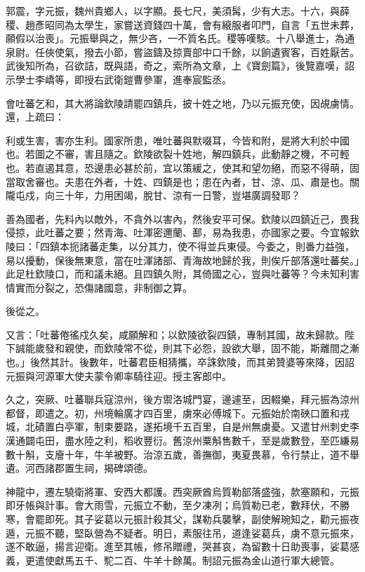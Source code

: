 \begin{pinyinscope}
 郭震，字元振，魏州貴鄉人，以字顯。長七尺，美須髯，少有大志。十六，與薛稷、趙彥昭同為太學生，家嘗送資錢四十萬，會有縗服者叩門，自言「五世未葬，願假以治喪」。元振舉與之，無少吝，一不質名氏。稷等嘆駭。十八舉進士，為通泉尉。任俠使氣，撥去小節，嘗盜鑄及掠賣部中口千餘，以餉遺賓客，百姓厭苦。武後知所為，召欲詰，既與語，奇之，索所為文章，上《寶劍篇》，後覽嘉嘆，詔示學士李嶠等，即授右武衛鎧曹參軍，進奉宸監丞。



 會吐蕃乞和，其大將論欽陵請罷四鎮兵，披十姓之地，乃以元振充使，因覘虜情。還，上疏曰：



 利或生害，害亦生利。國家所患，唯吐蕃與默啜耳，今皆和附，是將大利於中國也。若圖之不審，害且隨之。欽陵欲裂十姓地，解四鎮兵，此動靜之機，不可輕也。若直遏其意，恐邊患必甚於前，宜以策緩之，使其和望勿絕，而惡不得萌，固當取舍審也。夫患在外者，十姓、四鎮是也；患在內者，甘、涼、瓜、肅是也。關隴屯戍，向三十年，力用困竭，脫甘、涼有一日警，豈堪廣調發耶？



 善為國者，先料內以敵外，不貪外以害內，然後安平可保。欽陵以四鎮近己，畏我侵掠，此吐蕃之要；然青海、吐渾密邇蘭、鄯，易為我患，亦國家之要。今宜報欽陵曰：「四鎮本扼諸蕃走集，以分其力，使不得並兵東侵。今委之，則番力益強，易以擾動，保後無東意，當在吐渾諸部、青海故地歸於我，則俟斤部落還吐蕃矣。」此足杜欽陵口，而和議未絕。且四鎮久附，其倚國之心，豈與吐蕃等？今未知利害情實而分裂之，恐傷諸國意，非制御之算。



 後從之。



 又言：「吐蕃倦徭戍久矣，咸願解和；以欽陵欲裂四鎮，專制其國，故未歸款。陛下誠能歲發和親使，而欽陵常不從，則其下必怨，設欲大舉，固不能，斯離間之漸也。」後然其計。後數年，吐蕃君臣相猜攜，卒誅欽陵，而其弟贊婆等來降，因詔元振與河源軍大使夫蒙令卿率騎往迎。授主客郎中。



 久之，突厥、吐蕃聯兵寇涼州，後方禦洛城門宴，邊遽至，因輟樂，拜元振為涼州都督，即遣之。初，州境輪廣才四百里，虜來必傅城下。元振始於南硤口置和戎城，北磧置白亭軍，制束要路，遂拓境千五百里，自是州無虜憂。又遣甘州刺史李漢通闢屯田，盡水陸之利，稻收豐衍。舊涼州粟斛售數千，至是歲數登，至匹縑易數十斛，支廥十年，牛羊被野。治涼五歲，善撫御，夷夏畏慕，令行禁止，道不舉遺。河西諸郡置生祠，揭碑頌德。



 神龍中，遷左驍衛將軍、安西大都護。西突厥酋烏質勒部落盛強，款塞願和，元振即牙帳與計事。會大雨雪，元振立不動，至夕凍冽；烏質勒已老，數拜伏，不勝寒，會罷即死。其子娑葛以元振計殺其父，謀勒兵襲擊，副使解琬知之，勸元振夜遁，元振不聽，堅臥營為不疑者。明日，素服往吊，道逢娑葛兵，虜不意元振來，遂不敢逼，揚言迎衛。進至其帳，修吊贈禮，哭甚哀，為留數十日助喪事，娑葛感義，更遣使獻馬五千、駝二百、牛羊十餘萬。制詔元振為金山道行軍大總管。




\end{pinyinscope}
